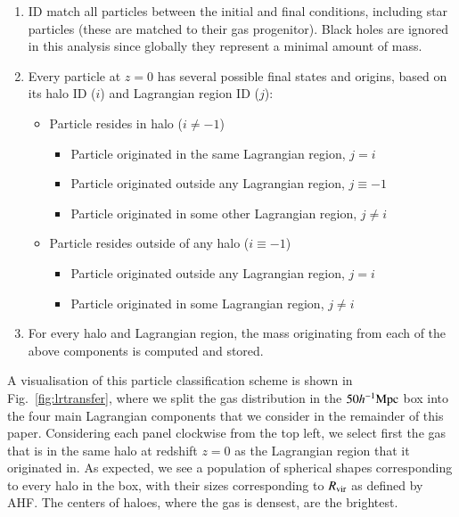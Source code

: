 \begin{enumerate}
	\item ID match all particles between the initial and final conditions, including
	      star particles (these are matched to their gas progenitor). Black holes are ignored in this analysis since globally they represent a minimal amount of mass.

	\item Every particle at $z=0$ has several possible final states and origins, based on its halo ID ($i$) and Lagrangian region ID ($j$):
	      \begin{itemize}
	            \item Particle resides in  halo ($i \neq -1$)
	            \begin{itemize}
	           		\item Particle originated in the same Lagrangian region, $j = i$
	           		\item Particle originated outside any Lagrangian region, $j \equiv -1$
	           		\item Particle originated in some other Lagrangian region, $j \neq i$
	            \end{itemize}
	            \item Particle resides outside of any halo ($i \equiv -1$)
	            \begin{itemize}
	            	\item Particle originated outside any Lagrangian region, $j = i$
	            	\item Particle originated in some Lagrangian region, $j \neq i$
	            \end{itemize}
	      \end{itemize}
	      
	\item For every halo and Lagrangian region, the mass originating from each
	      of the above components is computed and stored.
\end{enumerate}



A visualisation of this particle classification scheme is shown in
Fig.~\ref{fig:lrtransfer}, where we split the gas distribution in the
\simba{} $50h^{-1}{\rm Mpc}{}$ box into the four main Lagrangian components that we
consider in the remainder of this paper. Considering each panel clockwise
from the top left, we select first the gas that is in the same halo at
redshift $z=0$ as the Lagrangian region that it originated in. As expected,
we see a population of spherical shapes corresponding to every halo in the
box, with their sizes corresponding to $R_{\rm vir}$ as defined by AHF. The
centers of haloes, where the gas is densest, are the brightest.


